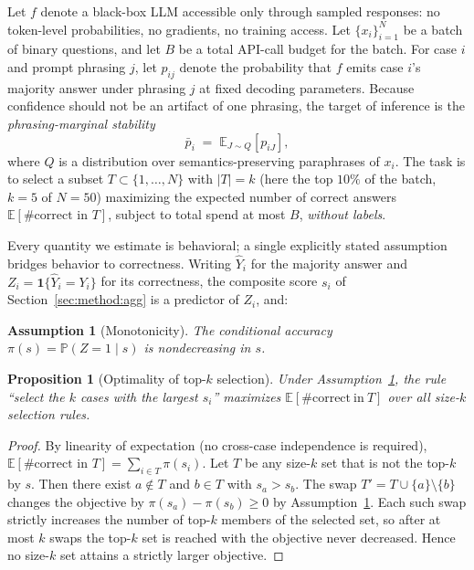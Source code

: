 \documentclass[11pt]{article}
\newtheorem{assumption}{Assumption}
\newtheorem{proposition}{Proposition}
\newcommand{\pbar}{\bar{p}}
\newcommand{\E}{\mathbb{E}}
\newcommand{\Prob}{\mathbb{P}}
\newcommand{\ind}{\mathbf{1}}
\newcommand{\score}{s}
\begin{document}
Let $f$ denote a black-box LLM accessible only through sampled responses:
no token-level probabilities, no gradients, no training access. Let
$\{x_i\}_{i=1}^{N}$ be a batch of binary questions, and let $B$ be a total
API-call budget for the batch. For case $i$ and prompt phrasing $j$, let
$p_{ij}$ denote the probability that $f$ emits case $i$'s majority answer
under phrasing $j$ at fixed decoding parameters. Because confidence should
not be an artifact of one phrasing, the target of inference is the
\emph{phrasing-marginal stability}
\begin{equation}
  \pbar_i \;=\; \E_{J \sim Q}\!\left[p_{iJ}\right],
  \label{eq:pbar}
\end{equation}
where $Q$ is a distribution over semantics-preserving paraphrases of
$x_i$. The task is to select a subset $T \subset \{1,\dots,N\}$ with
$|T| = k$ (here the top $10\%$ of the batch, $k = 5$ of $N = 50$) maximizing the expected number of correct
answers $\E\!\left[\#\text{correct in } T\right]$, subject to total spend
at most $B$, \emph{without labels}.

Every quantity we estimate is behavioral; a single explicitly stated
assumption bridges behavior to correctness. Writing $\hat Y_i$ for the
majority answer and $Z_i = \ind\{\hat Y_i = Y_i\}$ for its correctness,
the composite score $\score_i$ of Section~\ref{sec:method:agg} is a
predictor of $Z_i$, and:

\begin{assumption}[Monotonicity]
\label{ass:mono}
The conditional accuracy
$\pi(\score) = \Prob(Z = 1 \mid \score)$ is nondecreasing in $\score$.
\end{assumption}

\begin{proposition}[Optimality of top-$k$ selection]
\label{prop:topk}
Under Assumption~\ref{ass:mono}, the rule ``select the $k$ cases with the
largest $\score_i$'' maximizes $\E\!\left[\#\mathrm{correct\ in\ }
T\right]$ over all size-$k$ selection rules.
\end{proposition}

\begin{proof}
By linearity of expectation (no cross-case independence is required),
$\E[\#\text{correct in } T] = \sum_{i \in T} \pi(\score_i)$. Let $T$ be
any size-$k$ set that is not the top-$k$ by $\score$. Then there exist
$a \notin T$ and $b \in T$ with $\score_a > \score_b$. The swap
$T' = T \cup \{a\} \setminus \{b\}$ changes the objective by
$\pi(\score_a) - \pi(\score_b) \ge 0$ by Assumption~\ref{ass:mono}. Each
such swap strictly increases the number of top-$k$ members of the
selected set, so after at most $k$ swaps the top-$k$ set is reached with
the objective never decreased. Hence no size-$k$ set attains a strictly
larger objective.
\end{proof}
\end{document}

